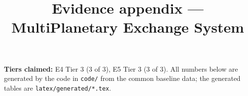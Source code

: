 \documentclass[10pt,letterpaper]{article}
\title{Evidence appendix --- MultiPlanetary Exchange System \\ \large \teamline}
\date{}
\begin{document}
\maketitle

\noindent\textbf{Tiers claimed:} E4 Tier 3 (3 of 3), E5 Tier 3 (3 of 3).
All numbers below are generated by the code in \texttt{code/} from the common baseline data; the generated tables are \texttt{latex/generated/*.tex}.







\end{document}
